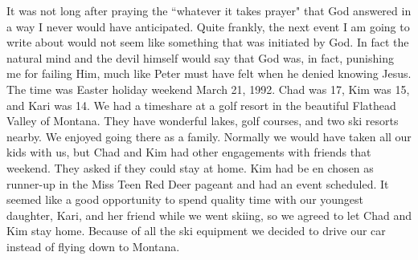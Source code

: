 \documentclass[oneside,12pt]{book}
\begin{document}
It was not long after praying the ``whatever it takes prayer" that God answered in a way I never would have anticipated. Quite frankly, the next event I am going to write about would not seem like something that was initiated by God. In fact the natural mind and the devil himself would say that God was, in fact, punishing me for failing Him, much like Peter must have felt when he denied knowing Jesus. The time was Easter holiday weekend March 21, 1992. Chad was 17, Kim was 15, and Kari was 14. We had a timeshare at a golf resort in the beautiful Flathead Valley of Montana. They have wonderful lakes, golf courses, and two ski resorts nearby. We enjoyed going there as a family. Normally we would have taken all our kids with us, but Chad and Kim had other engagements with friends that weekend. They asked if they could stay at home. Kim had be
en chosen as runner-up in the Miss Teen Red Deer pageant and had an event scheduled. It seemed like a good opportunity to spend quality time with our youngest daughter, Kari, and her friend while we went skiing, so we agreed to let Chad and Kim stay home. Because of all the ski equipment we decided to drive our car instead of flying down to Montana. 
\end{document}
